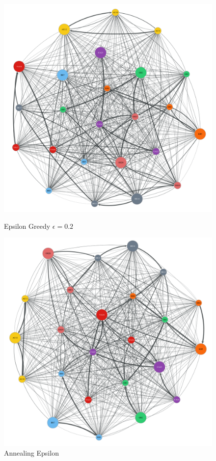 \begin{figure}[t]
    \centering
      \includegraphics[width=\linewidth]{figures/b-epsilon-greedy-0-2-e3}
      \caption{Epsilon Greedy $\epsilon=0.2$}\label{fig:epsilon_greedy_e2}
  \endminipage\hfill
    \includegraphics[width=\linewidth]{figures/b-annealing-epsilon-greedy-e5}
    \caption{Annealing Epsilon}\label{fig:annealing_epsilon}
  \endminipage
\end{figure}

